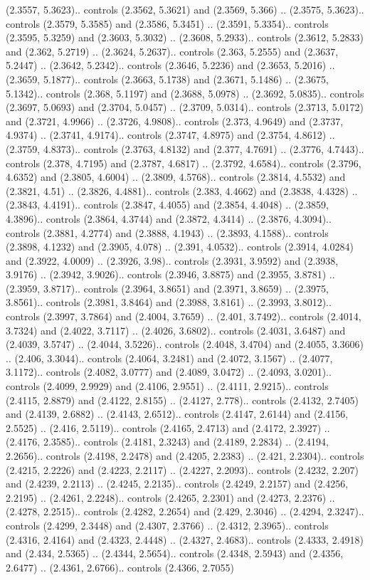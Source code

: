 (2.3557, 5.3623).. controls (2.3562, 5.3621) and (2.3569, 5.366) .. (2.3575, 5.3623).. controls (2.3579, 5.3585) and (2.3586, 5.3451) .. (2.3591, 5.3354).. controls (2.3595, 5.3259) and (2.3603, 5.3032) .. (2.3608, 5.2933).. controls (2.3612, 5.2833) and (2.362, 5.2719) .. (2.3624, 5.2637).. controls (2.363, 5.2555) and (2.3637, 5.2447) .. (2.3642, 5.2342).. controls (2.3646, 5.2236) and (2.3653, 5.2016) .. (2.3659, 5.1877).. controls (2.3663, 5.1738) and (2.3671, 5.1486) .. (2.3675, 5.1342).. controls (2.368, 5.1197) and (2.3688, 5.0978) .. (2.3692, 5.0835).. controls (2.3697, 5.0693) and (2.3704, 5.0457) .. (2.3709, 5.0314).. controls (2.3713, 5.0172) and (2.3721, 4.9966) .. (2.3726, 4.9808).. controls (2.373, 4.9649) and (2.3737, 4.9374) .. (2.3741, 4.9174).. controls (2.3747, 4.8975) and (2.3754, 4.8612) .. (2.3759, 4.8373).. controls (2.3763, 4.8132) and (2.377, 4.7691) .. (2.3776, 4.7443).. controls (2.378, 4.7195) and (2.3787, 4.6817) .. (2.3792, 4.6584).. controls (2.3796, 4.6352) and (2.3805, 4.6004) .. (2.3809, 4.5768).. controls (2.3814, 4.5532) and (2.3821, 4.51) .. (2.3826, 4.4881).. controls (2.383, 4.4662) and (2.3838, 4.4328) .. (2.3843, 4.4191).. controls (2.3847, 4.4055) and (2.3854, 4.4048) .. (2.3859, 4.3896).. controls (2.3864, 4.3744) and (2.3872, 4.3414) .. (2.3876, 4.3094).. controls (2.3881, 4.2774) and (2.3888, 4.1943) .. (2.3893, 4.1588).. controls (2.3898, 4.1232) and (2.3905, 4.078) .. (2.391, 4.0532).. controls (2.3914, 4.0284) and (2.3922, 4.0009) .. (2.3926, 3.98).. controls (2.3931, 3.9592) and (2.3938, 3.9176) .. (2.3942, 3.9026).. controls (2.3946, 3.8875) and (2.3955, 3.8781) .. (2.3959, 3.8717).. controls (2.3964, 3.8651) and (2.3971, 3.8659) .. (2.3975, 3.8561).. controls (2.3981, 3.8464) and (2.3988, 3.8161) .. (2.3993, 3.8012).. controls (2.3997, 3.7864) and (2.4004, 3.7659) .. (2.401, 3.7492).. controls (2.4014, 3.7324) and (2.4022, 3.7117) .. (2.4026, 3.6802).. controls (2.4031, 3.6487) and (2.4039, 3.5747) .. (2.4044, 3.5226).. controls (2.4048, 3.4704) and (2.4055, 3.3606) .. (2.406, 3.3044).. controls (2.4064, 3.2481) and (2.4072, 3.1567) .. (2.4077, 3.1172).. controls (2.4082, 3.0777) and (2.4089, 3.0472) .. (2.4093, 3.0201).. controls (2.4099, 2.9929) and (2.4106, 2.9551) .. (2.4111, 2.9215).. controls (2.4115, 2.8879) and (2.4122, 2.8155) .. (2.4127, 2.778).. controls (2.4132, 2.7405) and (2.4139, 2.6882) .. (2.4143, 2.6512).. controls (2.4147, 2.6144) and (2.4156, 2.5525) .. (2.416, 2.5119).. controls (2.4165, 2.4713) and (2.4172, 2.3927) .. (2.4176, 2.3585).. controls (2.4181, 2.3243) and (2.4189, 2.2834) .. (2.4194, 2.2656).. controls (2.4198, 2.2478) and (2.4205, 2.2383) .. (2.421, 2.2304).. controls (2.4215, 2.2226) and (2.4223, 2.2117) .. (2.4227, 2.2093).. controls (2.4232, 2.207) and (2.4239, 2.2113) .. (2.4245, 2.2135).. controls (2.4249, 2.2157) and (2.4256, 2.2195) .. (2.4261, 2.2248).. controls (2.4265, 2.2301) and (2.4273, 2.2376) .. (2.4278, 2.2515).. controls (2.4282, 2.2654) and (2.429, 2.3046) .. (2.4294, 2.3247).. controls (2.4299, 2.3448) and (2.4307, 2.3766) .. (2.4312, 2.3965).. controls (2.4316, 2.4164) and (2.4323, 2.4448) .. (2.4327, 2.4683).. controls (2.4333, 2.4918) and (2.434, 2.5365) .. (2.4344, 2.5654).. controls (2.4348, 2.5943) and (2.4356, 2.6477) .. (2.4361, 2.6766).. controls (2.4366, 2.7055) 